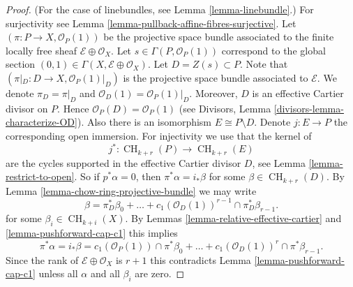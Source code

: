 \documentclass[10pt,a4paper]{amsart}
\theoremstyle{plain}
\theoremstyle{definition}
\theoremstyle{remark}
\numberwithin{equation}{subsection}
\def\CH{\mathop{\mathrm{CH}}\nolimits}
\begin{document}
\begin{proof}
(For the case of linebundles, see Lemma \ref{lemma-linebundle}.)
For surjectivity see Lemma \ref{lemma-pullback-affine-fibres-surjective}.
Let $(\pi  : P \to X, \mathcal{O}_P(1))$
be the projective space bundle associated
to the finite locally free sheaf $\mathcal{E} \oplus \mathcal{O}_X$.
Let $s \in \Gamma(P, \mathcal{O}_P(1))$ correspond to the global
section $(0, 1) \in \Gamma(X, \mathcal{E} \oplus \mathcal{O}_X)$.
Let $D = Z(s) \subset P$. Note that
$(\pi|_D : D \to X , \mathcal{O}_P(1)|_D)$
is the projective space bundle associated
to $\mathcal{E}$. We denote $\pi_D = \pi|_D$ and
$\mathcal{O}_D(1) = \mathcal{O}_P(1)|_D$.
Moreover, $D$ is an effective
Cartier divisor on $P$. Hence $\mathcal{O}_P(D) = \mathcal{O}_P(1)$
(see Divisors, Lemma \ref{divisors-lemma-characterize-OD}).
Also there is an isomorphism
$E \cong P \setminus D$. Denote $j : E \to P$ the
corresponding open immersion.
For injectivity we use that the kernel of
$$
j^* :
\CH_{k + r}(P)
\longrightarrow
\CH_{k + r}(E)
$$
are the cycles supported in the effective Cartier divisor $D$,
see Lemma \ref{lemma-restrict-to-open}. So if $p^*\alpha = 0$, then
$\pi^*\alpha = i_*\beta$ for some $\beta \in \CH_{k + r}(D)$.
By Lemma \ref{lemma-chow-ring-projective-bundle} we may write
$$
\beta = \pi_D^*\beta_0 +
\ldots + c_1(\mathcal{O}_D(1))^{r - 1} \cap \pi_D^* \beta_{r - 1}.
$$
for some $\beta_i \in \CH_{k + i}(X)$.
By Lemmas \ref{lemma-relative-effective-cartier}
and \ref{lemma-pushforward-cap-c1}
this implies
$$
\pi^*\alpha = i_*\beta =
c_1(\mathcal{O}_P(1)) \cap \pi^*\beta_0 +
\ldots +
c_1(\mathcal{O}_D(1))^r \cap \pi^*\beta_{r - 1}.
$$
Since the rank of $\mathcal{E} \oplus \mathcal{O}_X$ is $r + 1$
this contradicts Lemma \ref{lemma-pushforward-cap-c1} unless all
$\alpha$ and all $\beta_i$ are zero.
\end{proof}
\end{document}
